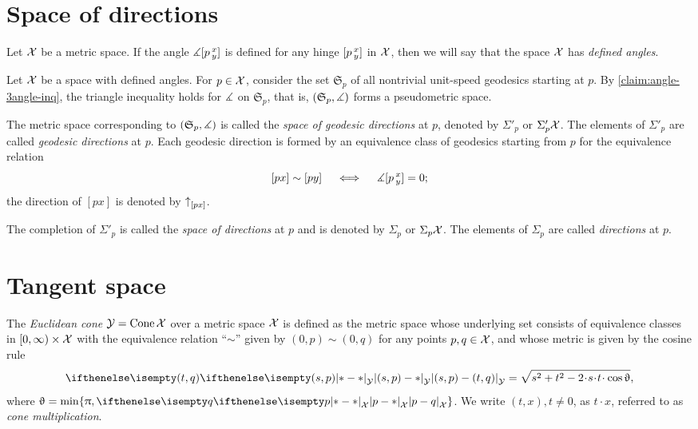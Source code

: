 \section{Space of directions} 
\label{sec:tangent-space+directions}

Let $\mathcal{X}$ be a metric space.
If the angle $\measuredangle[p\,{}^{x}_{y}]$ is defined for any hinge $[p\,{}^{x}_{y}]$ in $\mathcal{X}$,
then we will say that the space $\mathcal{X}$ has \emph{defined angles}.

 
Let $\mathcal{X}$ be a space with defined angles. For $p\in \spc{X}$,
consider the set $\mathfrak{S}_p$ 
of all nontrivial unit-speed geodesics starting at $p$.
By \ref{claim:angle-3angle-inq}, the triangle inequality holds for $\measuredangle$ on $\mathfrak{S}_p$,
that is, $(\mathfrak{S}_p,\measuredangle)$ 
forms a pseudometric space.

The metric space corresponding to  $(\mathfrak{S}_p,\measuredangle)$ is called the \emph{space of geodesic directions} at $p$, denoted by $\Sigma'_p$ or $\Sigma'_p\mathcal{X}$.
The elements of $\Sigma'_p$ are called \emph{geodesic directions} at $p$.
Each geodesic direction is formed by an equivalence class of geodesics starting from $p$ 
for the equivalence relation 
\[[px]\sim[py]\quad \iff\quad \measuredangle[p\,{}^{x}_{y}]=0;\]
the direction of $[px]$ is denoted by ${\uparrow}_{[{p}{x}]} $.



The completion of $\Sigma'_p$ is called the \emph{space of directions} at $p$ and is denoted by $\Sigma_p$ or $\Sigma_p\mathcal{X}$.
The elements of $\Sigma_p$ are called \emph{directions} at $p$.

\section{Tangent space}\label{sec: tangent space}

The \emph{Euclidean cone} $\mathcal{Y}=\mathop{\rm Cone}\nolimits\mathcal{X}$ 
over a metric space $\mathcal{X}$
is defined as the metric space whose underlying set consists of
equivalence classes in
$[0,\infty)\times \spc{X}$ with the equivalence relation ``$\sim$'' given by $(0,p)\sim (0,q)$ for any points $p,q\in\spc{X}$,
and whose metric is given by the cosine rule
\[
\dist{(s,p)}{(t,q)}{\spc{Y}} 
=
\sqrt{s^2+t^2-2\cdot s\cdot t\cdot \cos\theta},
\]
where $\theta= \min\{\pi, \dist{p}{q}{\spc{X}}\}$.
We write $(t,x), t \ne 0$, as $t\cdot x$, referred to as \emph{cone multiplication}.

